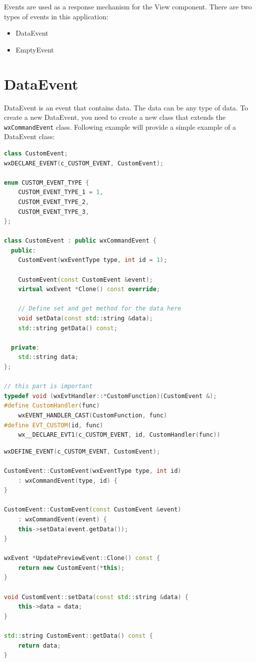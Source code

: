 Events are used as a response mechanism for the View component. There are two types of events in this application:
\begin{itemize}
      \item DataEvent
      \item EmptyEvent
\end{itemize}

\section{DataEvent}

DataEvent is an event that contains data. The data can be any type of data. To create a new DataEvent, you need to create a new class that extends the \texttt{wxCommandEvent} class. Following example will provide a simple example of a DataEvent class:

\begin{lstlisting}[language=C++, caption={CustomEvent class example}]
class CustomEvent;
wxDECLARE_EVENT(c_CUSTOM_EVENT, CustomEvent);

enum CUSTOM_EVENT_TYPE {
    CUSTOM_EVENT_TYPE_1 = 1,
    CUSTOM_EVENT_TYPE_2,
    CUSTOM_EVENT_TYPE_3,
};

class CustomEvent : public wxCommandEvent {
  public:
    CustomEvent(wxEventType type, int id = 1);

    CustomEvent(const CustomEvent &event);
    virtual wxEvent *Clone() const override;

    // Define set and get method for the data here
    void setData(const std::string &data);
    std::string getData() const;

  private:
    std::string data;
};

// this part is important
typedef void (wxEvtHandler::*CustomFunction)(CustomEvent &);
#define CustomHandler(func)                                             \
    wxEVENT_HANDLER_CAST(CustomFunction, func)
#define EVT_CUSTOM(id, func)                                           \
    wx__DECLARE_EVT1(c_CUSTOM_EVENT, id, CustomHandler(func))
\end{lstlisting}

\begin{lstlisting}[language=C++, caption={CustomEvent continued}]
wxDEFINE_EVENT(c_CUSTOM_EVENT, CustomEvent);

CustomEvent::CustomEvent(wxEventType type, int id)
    : wxCommandEvent(type, id) {
}

CustomEvent::CustomEvent(const CustomEvent &event)
    : wxCommandEvent(event) {
    this->setData(event.getData());
}

wxEvent *UpdatePreviewEvent::Clone() const {
    return new CustomEvent(*this);
}

void CustomEvent::setData(const std::string &data) {
    this->data = data;
}

std::string CustomEvent::getData() const {
    return data;
}
\end{lstlisting}

